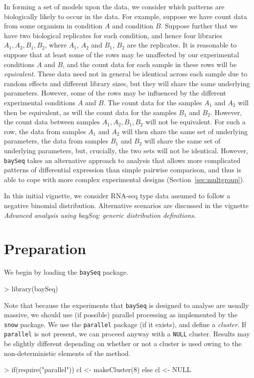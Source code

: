 \documentclass[a4paper]{article}
\begin{document}
In forming a set of models upon the data, we consider which patterns are biologically likely to occur in the data. For example, suppose we have count data from some organism in condition $A$ and condition $B$. Suppose further that we have two biological replicates for each condition, and hence four libraries $A_1, A_2, B_1, B_2$, where $A_1$, $A_2$ and $B_1$, $B_2$ are the replicates. It is reasonable to suppose that at least some of the rows may be unaffected by our experimental conditions $A$ and $B$, and the count data for each sample in these rows will be \textsl{equivalent}. These data need not in general be identical across each sample due to random effects and different library sizes, but they will share the same underlying parameters. However, some of the rows may be influenced by the different experimental conditions $A$ and $B$. The count data for the samples $A_1$ and $A_2$ will then be equivalent, as will the count data for the samples $B_1$ and $B_2$. However, the count data between samples $A_1, A_2, B_1, B_2$ will not be equivalent. For such a row, the data from samples $A_1$ and $A_2$ will then share the same set of underlying parameters, the data from samples $B_1$ and $B_2$ will share the same set of underlying parameters, but, crucially, the two sets will not be identical. However, \verb'baySeq' takes an alternative approach to analysis that allows more complicated patterns of differential expression than simple pairwise comparison, and thus is able to cope with more complex experimental designs (Section~\ref{sec:multgroup}).

In this initial vignette, we consider RNA-seq type data assumed to follow a negative binomial distribution. Alternative scenarios are discussed in the vignette \textsl{Advanced analysis using baySeq; generic distribution definitions}.

\section{Preparation}

We begin by loading the \verb'baySeq' package.



\begin{Schunk}
\begin{Sinput}
> library(baySeq)
\end{Sinput}
\end{Schunk}

Note that because the experiments that \verb'baySeq' is designed to analyse are usually massive, we should use (if possible) parallel processing as implemented by the \verb'snow' package. We use the \verb'parallel' package (if it exists), and define a \textsl{cluster}. If \verb'parallel' is not present, we can proceed anyway with a \verb'NULL' cluster. Results may be slightly different depending on whether or not a cluster is used owing to the non-deterministic elements of the method.
\begin{Schunk}
\begin{Sinput}
> if(require("parallel")) cl <- makeCluster(8) else cl <- NULL
\end{Sinput}
\end{Schunk}
\end{document}
